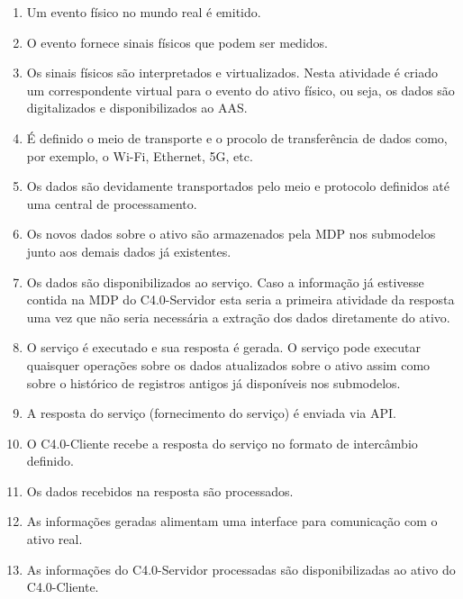 \begin{enumerate}

	\item Um evento físico no mundo real é emitido.

	\item O evento fornece sinais físicos que podem ser medidos.

	\item Os sinais físicos são interpretados e virtualizados. Nesta atividade é criado um correspondente virtual para o evento do ativo físico, ou seja, os dados são digitalizados e disponibilizados ao AAS.

	\item É definido o meio de transporte e o procolo de transferência de dados como, por exemplo, o Wi-Fi, Ethernet, 5G, etc.

	\item Os dados são devidamente transportados pelo meio e protocolo definidos até uma central de processamento.

	\item Os novos dados sobre o ativo são armazenados pela MDP nos submodelos junto aos demais dados já existentes.

	\item Os dados são disponibilizados ao serviço. Caso a informação já estivesse contida na MDP do C4.0-Servidor esta seria a primeira atividade da resposta uma vez que não seria necessária a extração dos dados diretamente do ativo.

	\item O serviço é executado e sua resposta é gerada. O serviço pode executar quaisquer operações sobre os dados atualizados sobre o ativo assim como sobre o histórico de registros antigos já disponíveis nos submodelos.

	\item A resposta do serviço (fornecimento do serviço) é enviada via API.

	\item O C4.0-Cliente recebe a resposta do serviço no formato de intercâmbio definido.

	\item Os dados recebidos na resposta são processados.

	\item As informações geradas alimentam uma interface para comunicação com o ativo real.

	\item As informações do C4.0-Servidor processadas são disponibilizadas ao ativo do C4.0-Cliente.
\end{enumerate}
